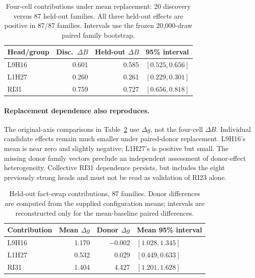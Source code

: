 \begin{table}[t]
\centering\scriptsize
\setlength{\tabcolsep}{3pt}
\begin{tabular}{@{}lrrl@{}}
\toprule
Head/group & Disc.\ $\Delta B$ & Held-out $\Delta B$ & 95\% interval \\
\midrule
L9H16 & 0.601 & 0.585 & $[0.525,0.656]$ \\
L1H27 & 0.260 & 0.261 & $[0.229,0.301]$ \\
RI31 & 0.759 & 0.727 & $[0.656,0.818]$ \\
\bottomrule
\end{tabular}
\caption{Four-cell contributions under mean replacement: 20 discovery versus
87 held-out families. All three held-out effects are positive in 87/87 families.
Intervals use the frozen 20,000-draw paired family bootstrap.}
\label{tab:s44-heldout-functional}
\end{table}

\paragraph{Replacement dependence also reproduces.}
The original-axis comparisons in Table~\ref{tab:s44-heldout-baselines} use
$\Delta g$, not the four-cell $\Delta B$. Individual candidate effects remain
much smaller under paired-donor replacement. L9H16's mean is near zero and
slightly negative; L1H27's is positive but small. The missing donor family
vectors preclude an independent assessment of donor-effect heterogeneity.
Collective RI31 dependence persists, but includes the eight previously strong
heads and must not be read as validation of RI23 alone.

\begin{table}[t]
\centering\scriptsize
\setlength{\tabcolsep}{3pt}
\begin{tabular}{@{}lrrl@{}}
\toprule
Contribution & Mean $\Delta g$ & Donor $\Delta g$ & Mean 95\% interval \\
\midrule
L9H16 & 1.170 & $-0.002$ & $[1.028,1.345]$ \\
L1H27 & 0.532 & 0.029 & $[0.449,0.633]$ \\
RI31 & 1.404 & 4.427 & $[1.201,1.628]$ \\
\bottomrule
\end{tabular}
\caption{Held-out fact-swap contributions, 87 families. Donor differences are
computed from the supplied configuration means; intervals are reconstructed
only for the mean-baseline paired differences.}
\label{tab:s44-heldout-baselines}
\end{table}

